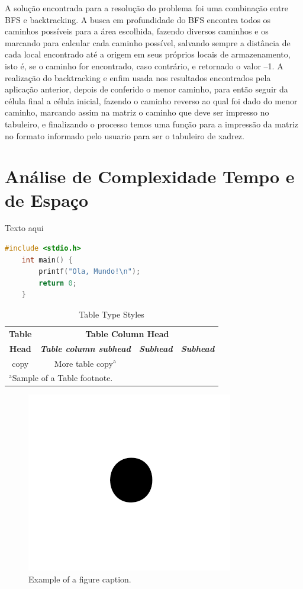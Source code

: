 \documentclass[relatorio]{IEEEtran}
\begin{document}
A solução encontrada para a resolução do problema foi uma combinação entre BFS e backtracking. A busca em profundidade do BFS encontra todos os caminhos possíveis para a área escolhida, fazendo diversos caminhos e os marcando para calcular cada caminho possível, salvando sempre a distância de cada local encontrado até a origem em seus próprios locais de armazenamento, isto é, se o caminho for encontrado, caso contrário, e retornado o valor –1. A realização do backtracking e enfim usada nos resultados encontrados pela aplicação anterior, depois de conferido o menor caminho, para então seguir da célula final a célula inicial, fazendo o caminho reverso ao qual foi dado do menor caminho, marcando assim na matriz o caminho que deve ser impresso no tabuleiro, e finalizando o processo temos uma função para a impressão da matriz no formato informado pelo usuario para ser o tabuleiro de xadrez.

\section{Análise de Complexidade Tempo e de Espaço}
Texto aqui
\begin{lstlisting}[language=C]
    #include <stdio.h>
    int main() {
        printf("Ola, Mundo!\n");
        return 0;
    }
\end{lstlisting}

\begin{table}[htbp]
\caption{Table Type Styles}
\begin{center}
\begin{tabular}{|c|c|c|c|}
\hline
\textbf{Table}&\multicolumn{3}{|c|}{\textbf{Table Column Head}} \\
\cline{2-4} 
\textbf{Head} & \textbf{\textit{Table column subhead}}& \textbf{\textit{Subhead}}& \textbf{\textit{Subhead}} \\
\hline
copy& More table copy$^{\mathrm{a}}$& &  \\
\hline
\multicolumn{4}{l}{$^{\mathrm{a}}$Sample of a Table footnote.}
\end{tabular}
\label{tab1}
\end{center}
\end{table}

\begin{figure}[htbp]
\centerline{\includegraphics{fig1.png}}
\caption{Example of a figure caption.}
\label{fig}
\end{figure}
\end{document}
